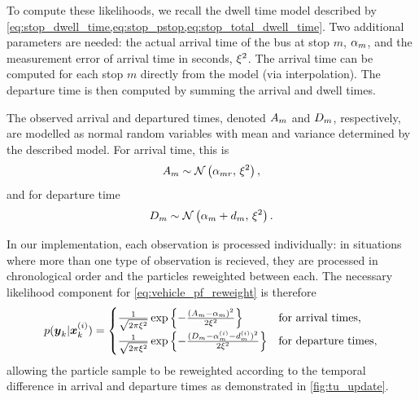 To compute these likelihoods, we recall the dwell time model described by \cref{eq:stop_dwell_time,eq:stop_pstop,eq:stop_total_dwell_time}. Two additional parameters are needed: the actual arrival time of the bus at stop $m$, $\alpha_{m}$, and the measurement error of arrival time in seconds, $\xi^2$. The arrival time can be computed for each stop $m$ directly from the model (via interpolation). The departure time is then computed by summing the arrival and dwell times.


The observed arrival and departured times, denoted $A_m$ and $D_m$, respectively, are modelled as normal random variables with mean and variance determined by the described model. For arrival time, this is
\begin{equation}
\label{eq:tu_arr_lhood}
A_m \sim \mathcal{N}\left(\alpha_{mr},\, \xi^2\right),
\end{equation}
and for departure time
\begin{equation}
\label{eq:tu_dep_lhood}
D_m \sim \mathcal{N}\left(\alpha_m + d_m,\, \xi^2\right).
\end{equation}


In our \pf{} implementation, each observation is processed individually: in situations where more than one type of observation is recieved, they are processed in chronological order and the particles reweighted between each. The necessary likelihood component for \cref{eq:vehicle_pf_reweight} is therefore
\begin{equation}
\label{eq:tu_obs_lhood}
p(\boldsymbol{y}_k | \boldsymbol x^{(i)}_k) =
\begin{cases}
\frac{1}{\sqrt{2\pi\xi^2}}
    \exp\left\{
        -\frac{(A_m - \alpha_m)^2}{2\xi^2}
    \right\} & \text{for arrival times,} \\
\frac{1}{\sqrt{2\pi\xi^2}}
    \exp\left\{
        -\frac{(D_m - \alpha^{(i)}_m - d^{(i)}_m)^2}{2\xi^2}
    \right\} & \text{for departure times,}
\end{cases}
\end{equation}
allowing the particle sample to be reweighted according to the temporal difference in arrival and departure times as demonstrated in \cref{fig:tu_update}.

